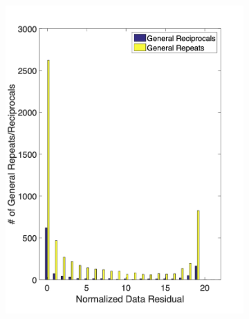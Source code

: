 \documentclass[final,authoryear,5p,times,twocolumn]{elsarticle}
\begin{document}
\begin{figure}[!ht]
   \centering
   \begin{subfigure}[b]{0.475\linewidth}
       \centering
       \includegraphics[trim=0.2cm 1cm 2cm 1.8cm, clip=true, width=\linewidth]{./Figures/Fig6a.png}
       \caption{}
       \label{fig:DataQC_RepRecip_NDR_Hist_Num}
   \end{subfigure}
   \hfill
   \begin{subfigure}[b]{0.475\linewidth}
       \centering

\end{subfigure}
\end{figure}
\end{document}

